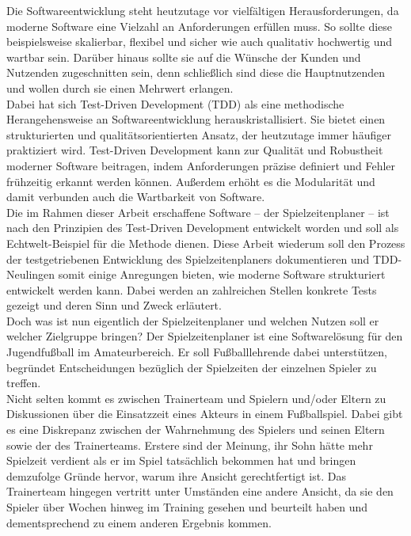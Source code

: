 
Die Softwareentwicklung steht heutzutage vor vielfältigen Herausforderungen, da moderne 
Software eine Vielzahl an Anforderungen erfüllen muss. So sollte diese beispielsweise 
skalierbar, flexibel und sicher wie auch qualitativ hochwertig und wartbar sein. 
Darüber hinaus sollte sie auf die Wünsche der Kunden und Nutzenden zugeschnitten sein, 
denn schließlich sind diese die Hauptnutzenden und wollen durch sie einen Mehrwert 
erlangen. \\ 
Dabei hat sich Test-Driven Development (TDD) als eine methodische Herangehensweise an 
Softwareentwicklung herauskristallisiert. Sie bietet einen strukturierten und 
qualitätsorientierten Ansatz, der heutzutage immer häufiger praktiziert wird. 
Test-Driven Development kann zur Qualität und Robustheit moderner Software beitragen, 
indem Anforderungen präzise definiert und Fehler frühzeitig erkannt werden können. 
Außerdem erhöht es die Modularität und damit verbunden auch die Wartbarkeit von 
Software. \\ 
Die im Rahmen dieser Arbeit erschaffene Software -- der Spielzeitenplaner -- ist nach 
den Prinzipien des Test-Driven Development entwickelt worden und soll als 
Echtwelt-Beispiel für die Methode dienen. Diese Arbeit wiederum soll den Prozess der 
testgetriebenen Entwicklung des Spielzeitenplaners dokumentieren und TDD-Neulingen somit 
einige Anregungen bieten, wie moderne Software strukturiert entwickelt werden kann. 
Dabei werden an zahlreichen Stellen konkrete Tests gezeigt und deren Sinn und Zweck 
erläutert. \\ 
Doch was ist nun eigentlich der Spielzeitenplaner und welchen Nutzen soll er welcher 
Zielgruppe bringen? Der Spielzeitenplaner ist eine Softwarelösung für den Jugendfußball 
im Amateurbereich. Er soll Fußballlehrende dabei unterstützen, begründet Entscheidungen 
bezüglich der Spielzeiten der einzelnen Spieler zu treffen. \\ 
Nicht selten kommt es zwischen Trainerteam und Spielern und/oder Eltern zu Diskussionen 
über die Einsatzzeit eines Akteurs in einem Fußballspiel. Dabei gibt es eine Diskrepanz 
zwischen der Wahrnehmung des Spielers und seinen Eltern sowie der des Trainerteams. 
Erstere sind der Meinung, ihr Sohn hätte mehr Spielzeit verdient als er im Spiel 
tatsächlich bekommen hat und bringen demzufolge Gründe hervor, warum ihre Ansicht 
gerechtfertigt ist. Das Trainerteam hingegen vertritt unter Umständen eine andere 
Ansicht, da sie den Spieler über Wochen hinweg im Training gesehen und beurteilt 
haben und dementsprechend zu einem anderen Ergebnis kommen. \\ 
